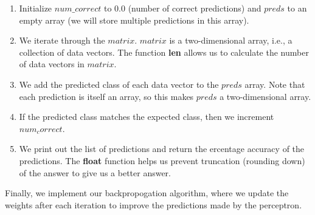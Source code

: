	\begin{enumerate}
		\item Initialize $num\_correct$ to $0.0$ (number of correct predictions) and $preds$ to an empty array (we will store multiple predictions in this array). 
		
		\item We iterate through the $matrix$. $matrix$ is a two-dimensional array, i.e., a collection of data vectors. The function \textbf{len} allows us to calculate the number of data vectors in $matrix$. 
		
		\item We add the predicted class of each data vector to the $preds$ array. Note that each prediction is itself an array, so this makes $preds$ a two-dimensional array.
		
		\item If the predicted class matches the expected class, then we increment $num_correct$. 
		
		\item We print out the list of predictions and return the ercentage accuracy of the predictions. The \textbf{float} function helps us prevent truncation (rounding down) of the answer to give us a better answer.
	\end{enumerate}
Finally, we implement our backpropogation algorithm, where we update the weights after each iteration to improve the predictions made by the perceptron.

